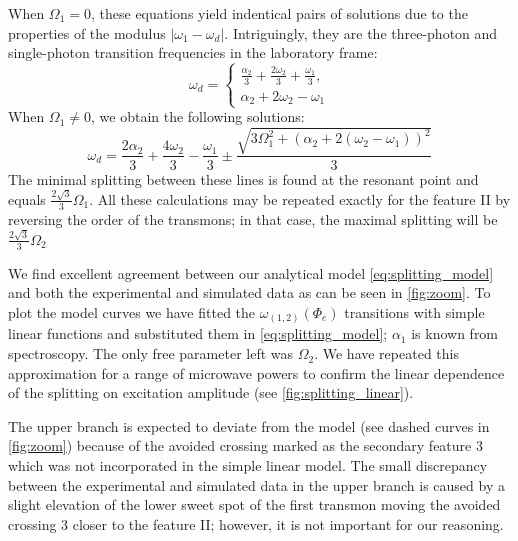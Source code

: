 \documentclass[%
 aip,
 amsmath,amssymb,
 reprint,%
]{revtex4-1}
\begin{document}
When $\Omega_1 = 0$, these equations yield indentical pairs of solutions due to the properties of the modulus $|\omega_1 - \omega_d|$. Intriguingly, they are the three-photon and single-photon transition frequencies in the laboratory frame:
\begin{equation}
\omega_d = \begin{cases} \frac{\alpha_2}{3} + \frac{2 \omega_{2}}{3} + \frac{\omega_{1}}{3}, \\ \alpha_2 + 2 \omega_{2} - \omega_{1}\end{cases}
\end{equation}
When $\Omega_1 \neq 0$, we obtain the following solutions:
\begin{equation}
\omega_d = \frac{2 \alpha_2}{3} + \frac{4 \omega_{2}}{3} - \frac{\omega_{1}}{3} \pm \frac{\sqrt{3 \Omega_{1}^{2} + \left( \alpha_2 + 2 (\omega_{2} - \omega_{1})\right)^{2}}}{3}
\label{eq:splitting_model}
\end{equation}
The minimal splitting between these lines is found at the resonant point and equals $\frac{2 \sqrt{3}}{{3}} \Omega_1$. All these calculations may be repeated exactly for the feature II by reversing the order of the transmons; in that case, the maximal splitting will be $\frac{2 \sqrt{3}}{{3}} \Omega_2$

We find excellent agreement between our analytical model \eqref{eq:splitting_model} and both the experimental and simulated data as can be seen in \autoref{fig:zoom}. To plot the model curves we have fitted the $\omega_{(1,2)}(\Phi_e)$ transitions with simple linear functions and substituted them in \eqref{eq:splitting_model}; $\alpha_1$ is known from spectroscopy. The only free parameter left was $\Omega_2$. We have repeated this approximation for a range of microwave powers to confirm the linear dependence of the splitting on excitation amplitude (see \autoref{fig:splitting_linear}).

The upper branch is expected to deviate from the model (see dashed curves in \autoref{fig:zoom}) because of the avoided crossing marked as the secondary feature 3 which was not incorporated in the simple linear model. The small discrepancy between the experimental and simulated data in the upper branch is caused by a slight elevation of the lower sweet spot of the first transmon moving the avoided crossing 3 closer to the feature II; however, it is not important for our reasoning.	
\end{document}
